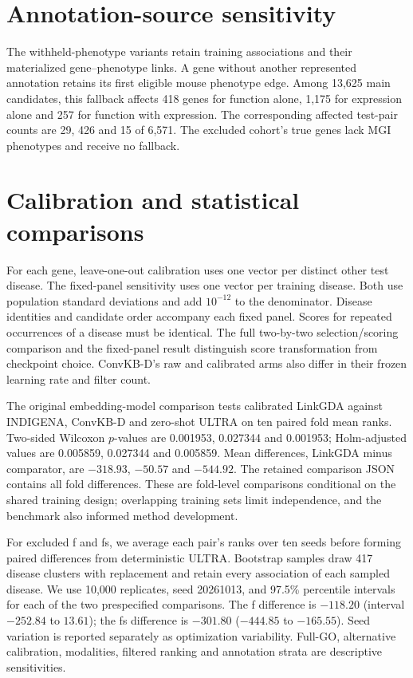 \documentclass{article}
\begin{document}
\section{Annotation-source sensitivity}



The withheld-phenotype variants retain training associations and their
materialized gene--phenotype links. A gene without another represented
annotation retains its first eligible mouse phenotype edge. Among 13,625
main candidates, this fallback affects 418 genes for function alone,
1,175 for expression alone and 257 for function with expression. The
corresponding affected test-pair counts are 29, 426 and 15 of 6,571.
The excluded cohort's true genes lack MGI phenotypes and receive no fallback.

\section{Calibration and statistical comparisons}
\label{sec:calibration_comparisons}



For each gene, leave-one-out calibration uses one vector per distinct other
test disease. The fixed-panel sensitivity uses one vector per training disease.
Both use population standard deviations and add $10^{-12}$ to the denominator.
Disease identities and candidate order accompany each fixed panel. Scores for
repeated occurrences of a disease must be identical. The full two-by-two
selection/scoring comparison and the fixed-panel result distinguish score
transformation from checkpoint choice. ConvKB-D's raw and calibrated arms
also differ in their frozen learning rate and filter count.

The original embedding-model comparison tests calibrated LinkGDA against INDIGENA,
ConvKB-D and zero-shot ULTRA on ten paired fold mean ranks. Two-sided Wilcoxon
$p$-values are 0.001953, 0.027344 and 0.001953; Holm-adjusted values are
0.005859, 0.027344 and 0.005859. Mean differences, LinkGDA minus comparator,
are $-318.93$, $-50.57$ and $-544.92$. The retained comparison JSON contains
all fold differences. These are fold-level comparisons conditional on the
shared training design; overlapping training sets limit independence, and
the benchmark also informed method development.

For excluded f and fs, we average each pair's ranks over ten seeds before
forming paired differences from deterministic ULTRA. Bootstrap samples draw
417 disease clusters with replacement and retain every association of each
sampled disease. We use 10,000 replicates, seed 20261013, and 97.5\% percentile
intervals for each of the two prespecified comparisons. The f difference is
$-118.20$ (interval $-252.84$ to $13.61$); the fs difference is $-301.80$
($-444.85$ to $-165.55$). Seed variation is reported separately as optimization
variability. Full-GO, alternative calibration, modalities, filtered ranking
and annotation strata are descriptive sensitivities.
\end{document}
